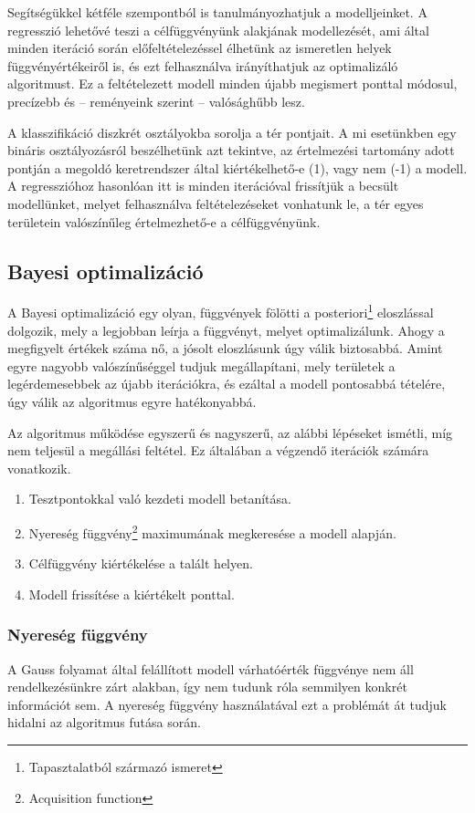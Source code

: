 Segítségükkel kétféle szempontból is tanulmányozhatjuk a modelljeinket. A regresszió lehetővé teszi a célfüggvényünk alakjának modellezését, ami által minden iteráció során előfeltételezéssel élhetünk az ismeretlen helyek függvényértékeiről is, és ezt felhasználva irányíthatjuk az optimalizáló algoritmust. Ez a feltételezett modell minden újabb megismert ponttal módosul, precízebb és -- reményeink szerint -- valósághűbb lesz.

A klasszifikáció diszkrét osztályokba sorolja a tér pontjait. A mi esetünkben egy bináris osztályozásról beszélhetünk azt tekintve, az értelmezési tartomány adott pontján a megoldó keretrendszer által kiértékelhető-e (1), vagy nem (-1) a modell. A regresszióhoz hasonlóan itt is minden iterációval frissítjük a becsült modellünket, melyet felhasználva feltételezéseket vonhatunk le, a tér egyes területein valószínűleg értelmezhető-e a célfüggvényünk.\cite{GPKonyv}


\subsection{Bayesi optimalizáció}
\label{subsec:bayes}
A Bayesi optimalizáció egy olyan, függvények fölötti a posteriori\footnote{Tapasztalatból származó ismeret} eloszlással dolgozik, mely a legjobban leírja a függvényt, melyet optimalizálunk. Ahogy a megfigyelt értékek száma nő, a jósolt eloszlásunk úgy válik biztosabbá. Amint egyre nagyobb valószínűséggel tudjuk megállapítani, mely területek a legérdemesebbek az újabb iterációkra, és ezáltal a modell pontosabbá tételére, úgy válik az algoritmus egyre hatékonyabbá.

Az algoritmus működése egyszerű és nagyszerű, az alábbi lépéseket ismétli, míg nem teljesül a megállási feltétel. Ez általában a végzendő iterációk számára vonatkozik.
\begin{enumerate}
	\item Tesztpontokkal való kezdeti modell betanítása.
	\item Nyereség függvény\footnote{Acquisition function} maximumának megkeresése a modell alapján.
	\item Célfüggvény kiértékelése a talált helyen.
	\item Modell frissítése a kiértékelt ponttal.
\end{enumerate}

\subsubsection{Nyereség függvény}
A Gauss folyamat által felállított modell várhatóérték függvénye nem áll rendelkezésünkre zárt alakban, így nem tudunk róla semmilyen konkrét információt sem. A nyereség függvény használatával ezt a problémát át tudjuk hidalni az algoritmus futása során. 

